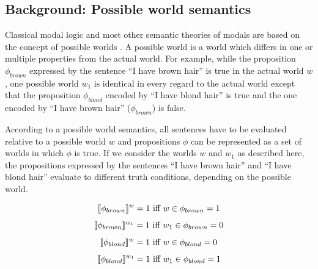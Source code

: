 \subsection{Background: Possible world semantics}

Classical modal logic and most other semantic theories of modals are based on the concept of possible worlds \cite{kripke1963}.
A possible world is a world which differs in one or multiple properties from the actual world. For example, while the proposition $\phi_{brown}$
expressed by the  sentence ``I have brown hair'' is true in the actual world $w$, one possible world $w_1$ is identical in every regard to 
the actual world except that the proposition $\phi_{blond}$ encoded by ``I have blond hair'' is true and the one encoded by
``I have brown hair'' ($\phi_{brown}$) is false. 

According to  a possible world semantics, all sentences have to be evaluated relative to a possible world $w$ and
propositions $\phi$ can be represented as a set of worlds in which $\phi$ is true. If we consider the worlds $w$ and $w_1$ as described here,
the propositions expressed by the sentences ``I have brown hair'' and ``I have blond hair'' evaluate to different truth conditions, depending on the possible world.

$$\llbracket\phi_{brown}\rrbracket^w = 1 \mbox{ iff } w \in \phi_{brown}  = 1$$
$$\llbracket\phi_{brown}\rrbracket^{w_1} = 1 \mbox{ iff } w_1 \in \phi_{brown}  = 0$$
$$\llbracket\phi_{blond}\rrbracket^{w} = 1\mbox{ iff } w \in \phi_{blond} = 0$$
$$\llbracket\phi_{blond}\rrbracket^{w_1} = 1 \mbox{ iff } w_1 \in \phi_{blond} = 1$$

















